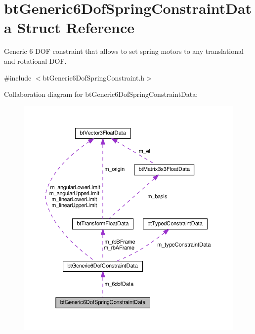 \hypertarget{structbtGeneric6DofSpringConstraintData}{}\section{bt\+Generic6\+Dof\+Spring\+Constraint\+Data Struct Reference}
\label{structbtGeneric6DofSpringConstraintData}


Generic 6 D\+OF constraint that allows to set spring motors to any translational and rotational D\+OF.  




{\ttfamily \#include $<$bt\+Generic6\+Dof\+Spring\+Constraint.\+h$>$}



Collaboration diagram for bt\+Generic6\+Dof\+Spring\+Constraint\+Data\+:
\nopagebreak
\begin{figure}[H]
\begin{center}
\leavevmode
\includegraphics[width=350pt]{structbtGeneric6DofSpringConstraintData__coll__graph}
\end{center}
\end{figure}
